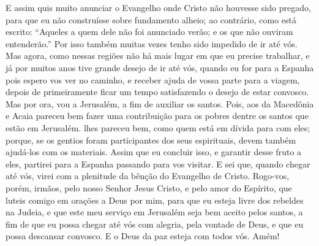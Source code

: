 {E assim quis muito anunciar o Evangelho onde Cristo não houvesse sido pregado, para que eu não construísse sobre fundamento alheio;
ao contrário, como está escrito: “Aqueles a quem dele não foi anunciado
{} verão; e os que não ouviram entenderão.”
{}
Por isso também muitas vezes tenho sido impedido de ir até vós.
Mas agora, como nessas regiões não há mais lugar em que eu precise trabalhar,
 e já por muitos anos tive grande desejo de ir até vós,
quando eu for para a Espanha
 pois espero vos ver no caminho, e receber ajuda de vossa parte para a viagem, depois de primeiramente ficar um tempo satisfazendo o desejo de estar convosco.
Mas por ora, vou a Jerusalém, a fim de auxiliar os santos.
Pois, aos da Macedônia e Acaia pareceu bem fazer uma contribuição para os pobres dentre os santos que estão em Jerusalém.
 lhes pareceu bem, como quem está em dívida para com eles; porque, se os gentios foram participantes dos seus
{} espirituais, devem também ajudá-los com os materiais.
Assim que eu concluir isso, e garantir
{} desse fruto a eles, partirei para a Espanha passando para vos visitar.
E sei que, quando chegar até vós, virei com a plenitude da bênção do Evangelho de Cristo.
Rogo-vos, porém, irmãos, pelo nosso Senhor Jesus Cristo, e pelo amor do Espírito, que luteis comigo em orações a Deus por mim,
para que eu esteja livre dos rebeldes na Judeia, e que este meu serviço em Jerusalém seja bem aceito pelos santos,
a fim de que eu possa chegar até vós com alegria, pela vontade de Deus, e que eu possa descansar convosco.
E o Deus da paz esteja com todos vós. Amém!

}

